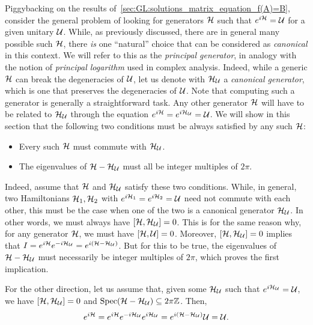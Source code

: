 Piggybacking on the results of~\cref{sec:GL:solutions_matrix_equation_f(A)=B}, consider the general problem of looking for generators ${\mathcal{H}}$ such that $e^{i{\mathcal{H}}}={\mathcal{U}}$ for a given unitary ${\mathcal{U}}$.
While, as previously discussed, there are in general many possible such ${\mathcal{H}}$, there \textit{is} one ``natural'' choice that can be considered as \emph{canonical} in this context. We will refer to this as the \emph{principal generator}, in analogy with the notion of \emph{principal logarithm} used in complex analysis.
Indeed, while a generic ${\mathcal{H}}$ can break the degeneracies of ${\mathcal{U}}$, let us denote with ${\mathcal{H}}_{{\mathcal{U}}}$ a \textit{canonical generator}, which is one that preserves the degeneracies of ${\mathcal{U}}$.
Note that computing such a generator is generally a straightforward task.
Any other generator ${\mathcal{H}}$ will have to be related to ${\mathcal{H}}_{{\mathcal{U}}}$ through the equation $e^{i{\mathcal{H}}}=e^{i{\mathcal{H}}_{{\mathcal{U}}}}={\mathcal{U}}$.
We will show in this section that the following two conditions must be always satisfied by any such ${\mathcal{H}}$:
\begin{itemize}
    \item Every such ${\mathcal{H}}$ must commute with ${\mathcal{H}}_{{\mathcal{U}}}$.
    \item The eigenvalues of ${\mathcal{H}}-{\mathcal{H}}_{{\mathcal{U}}}$ must all be integer multiples of $2\pi$.
\end{itemize}

Indeed, assume that ${\mathcal{H}}$ and ${\mathcal{H}}_{{\mathcal{U}}}$ satisfy these two conditions.
While, in general, two Hamiltonians ${\mathcal{H}}_1,{\mathcal{H}}_2$ with $e^{i{\mathcal{H}}_1}=e^{i{\mathcal{H}}_2}={\mathcal{U}}$ need not commute with each other, this must be the case when one of the two is a canonical generator ${\mathcal{H}}_{{\mathcal{U}}}$. In other words, we must always have $[{\mathcal{H}},{\mathcal{H}}_{{\mathcal{U}}}]=0$.
This is for the same reason why, for any generator ${\mathcal{H}}$, we must have $[{\mathcal{H}},{\mathcal{U}}]=0$.
Moreover, $[{\mathcal{H}},{\mathcal{H}}_{{\mathcal{U}}}]=0$ implies that
$I=e^{i{\mathcal{H}}}e^{-i{\mathcal{H}}_{{\mathcal{U}}}}=e^{i({\mathcal{H}}-{\mathcal{H}}_{{\mathcal{U}}})}$.
But for this to be true, the eigenvalues of ${\mathcal{H}}-{\mathcal{H}}_{{\mathcal{U}}}$ must necessarily be integer multiples of $2\pi$, which proves the first implication.

For the other direction, let us assume that, given some ${\mathcal{H}}_{{\mathcal{U}}}$ such that $e^{i{\mathcal{H}}_{{\mathcal{U}}}}={\mathcal{U}}$, we have $[{\mathcal{H}},{\mathcal{H}}_{{\mathcal{U}}}]=0$ and $\operatorname{Spec}({\mathcal{H}}-{\mathcal{H}}_{{\mathcal{U}}})\subseteq2\pi\mathbb{Z}$.
Then,
\begin{equation}
    e^{i{\mathcal{H}}} =
    e^{i{\mathcal{H}}} e^{-i{\mathcal{H}}_{{\mathcal{U}}}} e^{i{\mathcal{H}}_{{\mathcal{U}}}} =
    e^{i({\mathcal{H}}-{\mathcal{H}}_{{\mathcal{U}}})} {\mathcal{U}} =
    {\mathcal{U}}.
\end{equation}

